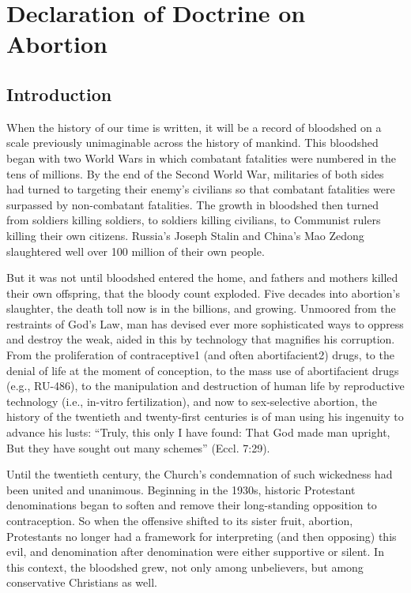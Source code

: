 \documentclass[
]{book}
\begin{document}
\hypertarget{declaration-of-doctrine-on-abortion}{%
\chapter*{Declaration of Doctrine on Abortion}\label{declaration-of-doctrine-on-abortion}}

\hypertarget{introduction-1}{%
\section*{Introduction}\label{introduction-1}}

When the history of our time is written, it will be a record of bloodshed on a scale previously unimaginable across the history of mankind. This bloodshed began with two World Wars in which combatant fatalities were numbered in the tens of millions. By the end of the Second World War, militaries of both sides had turned to targeting their enemy's civilians so that combatant fatalities were surpassed by non-combatant fatalities. The growth in bloodshed then turned from soldiers killing soldiers, to soldiers killing civilians, to Communist rulers killing their own citizens. Russia's Joseph Stalin and China's Mao Zedong slaughtered well over 100 million of their own people.

But it was not until bloodshed entered the home, and fathers and mothers killed their own offspring, that the bloody count exploded. Five decades into abortion's slaughter, the death toll now is in the billions, and growing. Unmoored from the restraints of God's Law, man has devised ever more sophisticated ways to oppress and destroy the weak, aided in this by technology that magnifies his corruption. From the proliferation of contraceptive1 (and often abortifacient2) drugs, to the denial of life at the moment of conception, to the mass use of abortifacient drugs (e.g., RU-486), to the manipulation and destruction of human life by reproductive technology (i.e., in-vitro fertilization), and now to sex-selective abortion, the history of the twentieth and twenty-first centuries is of man using his ingenuity to advance his lusts: ``Truly, this only I have found: That God made man upright, But they have sought out many schemes'' (Eccl. 7:29).

Until the twentieth century, the Church's condemnation of such wickedness had been united and unanimous. Beginning in the 1930s, historic Protestant denominations began to soften and remove their long-standing opposition to contraception. So when the offensive shifted to its sister fruit, abortion, Protestants no longer had a framework for interpreting (and then opposing) this evil, and denomination after denomination were either supportive or silent. In this context, the bloodshed grew, not only among unbelievers, but among conservative Christians as well.
\end{document}
